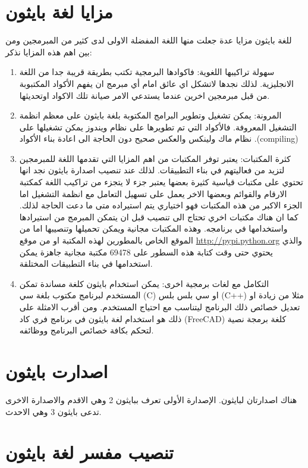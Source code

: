 \section{ مزايا لغة بايثون}
للغة بايثون مزايا عدة جعلت منها اللغة المفضلة الاولى لدى كثير من المبرمجين ومن بين اهم هذه المزايا نذكر:
\begin{enumerate}
\item
سهولة تراكيبها اللغوية: فاكوادها البرمجية تكتب بطريقة قريبة جدا من اللغة الانجليزية. لذلك نجدها لاتشكل اي عائق امام أي مبرمج ان يفهم الأكواد المكتبوبة من قبل مبرمجين اخرين عندما يستدعي الامر صيانة تلك الاكواد اوتحديثها.
\item
المرونة: يمكن تشغيل وتطوير البرامج المكتوبة بلغة بايثون على معظم انظمة التشغيل المعروفة. فالأكواد التي تم تطويرها على نظام ويندوز يمكن تشغيلها على نظام ماك ولينكس والعكس صحيح دون الحاجة الى اعادة بناء الأكواد
 .(compiling)
\item
كثرة المكتبات: يعتبر توفر المكتبات من اهم المزايا التي تقدمها اللغة للمبرمجين لتزيد من فعاليتهم في بناء التطبيقات. لذلك عند تنصيب اصدارة بايثون نجد انها تحتوي على مكتبات قياسية كثيرة بعضها يعتبر جزء لا يتجزء من تراكيب اللغة كمكتبة الارقام والقوائم وبعضها الاخر يعمل على تسهيل التعامل مع انظمة التشغيل اما الجزء الاكبر من هذه المكتبات فهو اختياري يتم استيراده متى ما دعت الحاجة لذلك. كما ان هناك مكتبات اخري تحتاج الى تنصيب قبل ان يتمكن المبرمج من استيرادها واستخدامها في برنامجه. وهذه المكتبات مجانية ويمكن تحميلها وتنصيبها اما من الموقع الخاص بالمطورين لهذه المكتبة او من موقع
 \href{http://pypi.python.org}{http://pypi.python.org}
  والذي يحتوي حتى وقت كتابة هذه السطور على 69478 مكتبة مجانية جاهزة يمكن استخدامها في بناء التطبيقات المختلقة.
\item
التكامل مع لغات برمجية اخرى: يمكن استخدام بايثون كلغة مساندة تمكن المستخدم لبرنامج مكتوب بلغة سي (C) او سي بلس بلس (C++) مثلا من زيادة او تعديل خصائص ذلك البرنامج ليتناسب مع احتياج المستخدم. ومن أقرب الامثلة على ذلك هو استخدام لغة بايثون في برنامج فري كاد (FreeCAD) كلغة برمجة نصية لتحكم بكافة خصائص البرنامج ووظائفه.
\end{enumerate}

\section{اصدارت بايثون}
هناك اصدارتان لبايثون. الإصدارة الأولى تعرف ببايثون 2 وهي الاقدم والاصدارة الاخرى تدعى بايثون 3 وهي الاحدث.
\section{تنصيب مفسر لغة بايثون}

